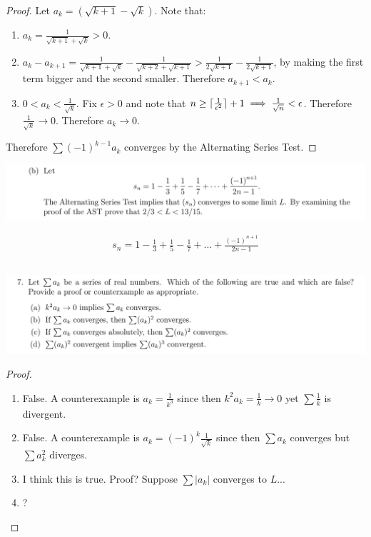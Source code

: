 \documentclass[12pt]{article}
\begin{document}
\begin{proof}
  Let $a_k = (\sqrt{k+1} - \sqrt{k})$. Note that:

  \begin{enumerate}[label=(\roman*)]
  \item $a_k = \frac{1}{\sqrt{k+1} + \sqrt{k}} > 0$.
  \item
    $a_k - a_{k+1} = \frac{1}{\sqrt{k+1} + \sqrt{k}} - \frac{1}{\sqrt{k+2} + \sqrt{k + 1}} >
    \frac{1}{2\sqrt{k+1}} - \frac{1}{2\sqrt{k+1}}$, by making the first term bigger and the second
    smaller. Therefore $a_{k+1} < a_k$.
  \item $0 < a_k < \frac{1}{\sqrt{k}}$. Fix $\epsilon > 0$ and note that
    $n \geq \lceil\frac{1}{\epsilon^2}\rceil + 1 \implies \frac{1}{\sqrt{n}} < \epsilon$. Therefore
    $\frac{1}{\sqrt{k}} \to 0$. Therefore $a_k \to 0$.
  \end{enumerate}
  Therefore $\sum (-1)^{k-1}a_k$ converges by the Alternating Series Test.
\end{proof}

\begin{mdframed}
\includegraphics[width=400pt]{img/analysis--oxford-M2-I-5-6-b.png}
\end{mdframed}
\begin{align*}
  s_n = 1 - \frac{1}{3} + \frac{1}{5} - \frac{1}{7} + \ldots + \frac{(-1)^{n+1}}{2n - 1}
\end{align*}


\newpage
\subsection{}
\begin{mdframed}
\includegraphics[width=400pt]{img/analysis--oxford-M2-I-5-7.png}
\end{mdframed}

\begin{proof}\hspace{0pt}
  \begin{enumerate}[label=(\alph*)]
  \item False. A counterexample is $a_k = \frac{1}{k^3}$ since then $k^2a_k = \frac{1}{k} \to 0$
    yet $\sum \frac{1}{k}$ is divergent.
  \item False. A counterexample is $a_k = (-1)^k\frac{1}{\sqrt{k}}$ since then $\sum a_k$ converges
    but $\sum a_k^2$ diverges.
  \item I think this is true. Proof? Suppose $\sum |a_k|$ converges to $L$...
  \item ?
  \end{enumerate}
\end{proof}
\end{document}

